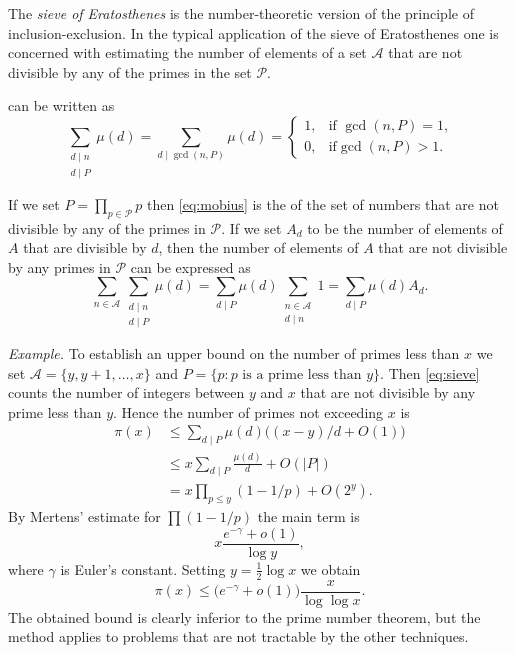 \documentclass[12pt]{article}
\newcommand*{\abs}[1]{\left\lvert #1\right\rvert}
\begin{document}

The \emph{sieve of Eratosthenes} is the number-theoretic version of the
principle of inclusion-exclusion. In the typical application of
the sieve of Eratosthenes one is concerned with estimating the
number of elements of a set $\mathcal{A}$ that are not divisible
by any of the primes in the set $\mathcal{P}$.

 can be written as
\begin{equation}\label{eq:mobius}
\sum_{\substack{d\mid n\\d\mid P}}\mu(d)=\sum_{d\mid \gcd(n,P)}
\mu(d)=\begin{cases}1,&\text{if }\gcd(n,P)=1,\\0,&\text{if
}\gcd(n,P)>1.\end{cases}
\end{equation}

If we set $P=\prod_{p\in\mathcal{P}} p$ then \eqref{eq:mobius} is
the  of the set of numbers that are not
divisible by any of the primes in $\mathcal{P}$. If we set $A_d$
to be the number of elements of $A$ that are divisible by $d$,
then the number of elements of $A$ that are not divisible by any
primes in $\mathcal{P}$ can be expressed as
\begin{equation}\label{eq:sieve}
\sum_{n\in\mathcal{A}}\sum_{\substack{d\mid n\\d\mid
P}}\mu(d)=\sum_{d\mid
P}\mu(d)\sum_{\substack{n\in\mathcal{A}\\d\mid n}}1=\sum_{d\mid
P}\mu(d)A_d.
\end{equation}

\emph{Example.} To establish an upper bound on the number of primes
less than $x$ we set $\mathcal{A}=\{y,y+1,\dotsc,x\}$ and $P=\{p :
p \text{ is a prime less than }y\}$. Then \eqref{eq:sieve} counts
the number of integers between $y$ and $x$ that are not divisible
by any prime less than $y$. Hence the number of primes not
exceeding $x$ is
\begin{align*}
\pi(x)&\leq \sum_{d\mid P}\mu(d) \bigl((x-y)/d+O(1)\bigr)\\
      &\leq x\sum_{d\mid P}\frac{\mu(d)}{d}+O(\abs{P})\\
      &= x\prod_{p\leq y} (1-1/p)+O(2^y).
\end{align*}
By Mertens' estimate for $\prod (1-1/p)$ the main term is
\begin{equation*}
x\frac{e^{-\gamma}+o(1)}{\log y},
\end{equation*}
where $\gamma$ is Euler's constant. Setting $y=\tfrac{1}{2}\log x$
we obtain
\begin{equation*}
\pi(x)\leq \bigl(e^{-\gamma}+o(1)\bigr)\frac{x}{\log\log x}.
\end{equation*}
The obtained bound is clearly inferior to the prime number
theorem, but the method applies to problems that are not tractable
by the other techniques.
\end{document}
